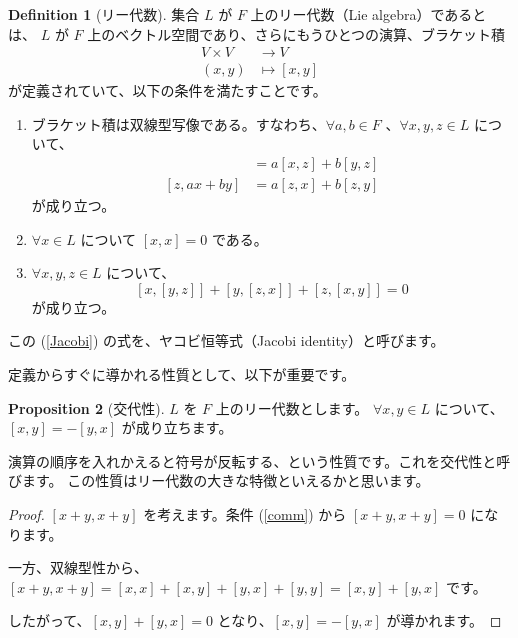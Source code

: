 \documentclass{ltjsarticle}
\theoremstyle{definition}
\newtheorem{definition}{Definition}[section]
\newtheorem{proposition}[definition]{Proposition}
\begin{document}
\begin{definition}[リー代数]
    集合 $L$ が $F$ 上のリー代数（Lie algebra）であるとは、
    $L$ が $F$ 上のベクトル空間であり、さらにもうひとつの演算、ブラケット積
    \begin{align*}
        V \times V & \to V          \\
        (x, y)     & \mapsto [x, y]
    \end{align*}
    が定義されていて、以下の条件を満たすことです。
    \begin{enumerate}
        \item ブラケット積は双線型写像である。すなわち、$\forall a, b \in F$ 、$\forall x, y, z \in L$ について、
              \begin{align*}
                  [ax + by, z] & = a[x, z] + b[y, z] \\
                  [z, ax + by] & = a[z, x] + b[z, y]
              \end{align*}
              が成り立つ。
        \item \label{comm} $\forall x \in L$ について $[x, x] = 0$ である。
        \item \label{Jacobi} $\forall x, y, z \in L$ について、
              \[
                  [x, [y, z]] + [y, [z, x]] + [z, [x, y]] = 0
              \]
              が成り立つ。
    \end{enumerate}
\end{definition}

この (\ref{Jacobi}) の式を、ヤコビ恒等式（Jacobi identity）と呼びます。

定義からすぐに導かれる性質として、以下が重要です。

\begin{proposition}[交代性]
    $L$ を $F$ 上のリー代数とします。
    $\forall x, y\in L$ について、$[x, y] = -[y, x]$ が成り立ちます。
\end{proposition}

演算の順序を入れかえると符号が反転する、という性質です。これを交代性と呼びます。
この性質はリー代数の大きな特徴といえるかと思います。

\begin{proof}
    $[x + y, x + y]$ を考えます。条件 (\ref{comm}) から $[x + y, x + y] = 0$ になります。

    一方、双線型性から、$[x + y, x + y] = [x, x] + [x, y] + [y, x] + [y, y] = [x, y] + [y, x]$ です。

    したがって、$[x, y] + [y, x] = 0$ となり、$[x, y] = -[y, x]$ が導かれます。
\end{proof}
\end{document}
